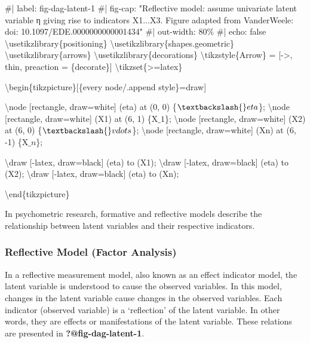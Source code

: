 \documentclass[
  letterpaper,
  DIV=11,
  numbers=noendperiod]{scrartcl}
\newenvironment{Shaded}{\begin{snugshade}}{\end{snugshade}}
\newcommand{\NormalTok}[1]{\textcolor[rgb]{0.00,0.23,0.31}{#1}}
\begin{document}
\begin{Shaded}
\begin{Highlighting}[]
\NormalTok{\#| label: fig{-}dag{-}latent{-}1}
\NormalTok{\#| fig{-}cap: "Reflective model: assume univariate latent variable η giving rise to indicators X1...X3. Figure adapted from VanderWeele: doi: 10.1097/EDE.0000000000001434"}
\NormalTok{\#| out{-}width: 80\%}
\NormalTok{\#| echo: false}
\NormalTok{\textbackslash{}usetikzlibrary\{positioning\}}
\NormalTok{\textbackslash{}usetikzlibrary\{shapes.geometric\}}
\NormalTok{\textbackslash{}usetikzlibrary\{arrows\}}
\NormalTok{\textbackslash{}usetikzlibrary\{decorations\}}
\NormalTok{\textbackslash{}tikzstyle\{Arrow\} = [{-}\textgreater{}, thin, preaction = \{decorate\}]}
\NormalTok{\textbackslash{}tikzset\{\textgreater{}=latex\}}



\NormalTok{\textbackslash{}begin\{tikzpicture\}[\{every node/.append style\}=draw]}

\NormalTok{\textbackslash{}node [rectangle, draw=white] (eta) at (0, 0) \{$\textbackslash{}eta$\};}
\NormalTok{\textbackslash{}node [rectangle, draw=white] (X1) at (6, 1) \{X$\_1$\};}
\NormalTok{\textbackslash{}node [rectangle, draw=white] (X2) at (6, 0) \{$\textbackslash{}vdots$\};}
\NormalTok{\textbackslash{}node [rectangle, draw=white] (Xn) at (6, {-}1) \{X$\_n$\};}

\NormalTok{\textbackslash{}draw [{-}latex, draw=black] (eta) to (X1);}
\NormalTok{\textbackslash{}draw [{-}latex, draw=black] (eta) to (X2);}
\NormalTok{\textbackslash{}draw [{-}latex, draw=black] (eta) to (Xn);}

\NormalTok{\textbackslash{}end\{tikzpicture\}}
\end{Highlighting}
\end{Shaded}

In psychometric research, formative and reflective models describe the
relationship between latent variables and their respective indicators.

\hypertarget{reflective-model-factor-analysis}{%
\subsubsection{Reflective Model (Factor
Analysis)}\label{reflective-model-factor-analysis}}

In a reflective measurement model, also known as an effect indicator
model, the latent variable is understood to cause the observed
variables. In this model, changes in the latent variable cause changes
in the observed variables. Each indicator (observed variable) is a
`reflection' of the latent variable. In other words, they are effects or
manifestations of the latent variable. These relations are presented in
\textbf{?@fig-dag-latent-1}.
\end{document}
